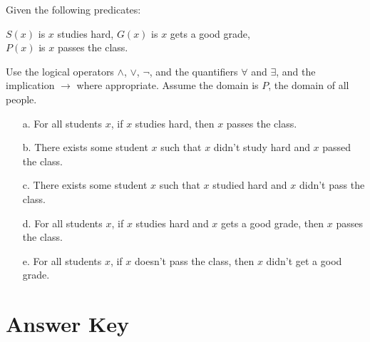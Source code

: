         
        \begin{questionNOGRADE}{\thequestion}
            Given the following predicates:

            \begin{center}
                $S(x)$ is $x$ studies hard, \tab $G(x)$ is $x$ gets a good grade, \\ $P(x)$ is $x$ passes the class.
            \end{center}

            Use the logical operators $\land$, $\lor$, $\neg$, and the quantifiers $\forall$ and $\exists$, and the implication $\to$ where appropriate.
            Assume the domain is $P$, the domain of all people.

            \begin{itemize}
                \item[a.]   For all students $x$, if $x$ studies hard, then $x$ passes the class.
                \item[b.]   There exists some student $x$ such that $x$ didn't study hard and $x$ passed the class.
                \item[c.]   There exists some student $x$ such that $x$ studied hard and $x$ didn't pass the class.
                \item[d.]   For all students $x$, if $x$ studies hard and $x$ gets a good grade, then $x$ passes the class.
                \item[e.]   For all students $x$, if $x$ doesn't pass the class, then $x$ didn't get a good grade.
            \end{itemize}
        \end{questionNOGRADE}

            
    \chapter*{Answer Key}


